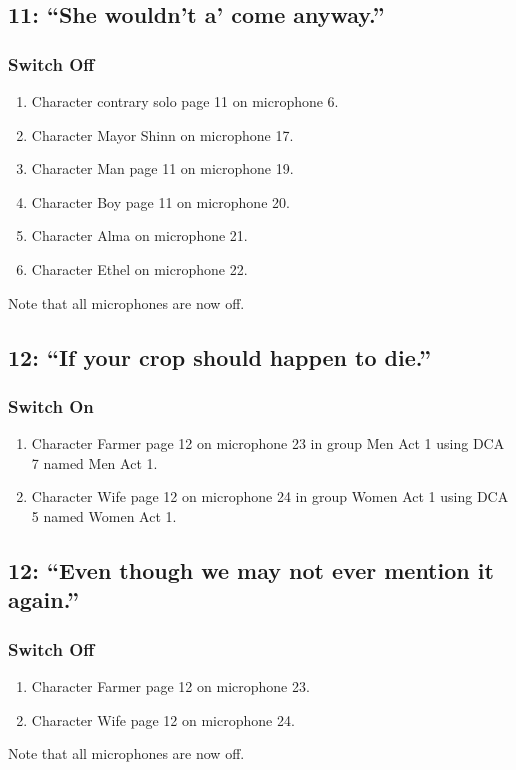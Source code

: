 \subsection* {11: ``She wouldn't a' come anyway.''}
\subsubsection* {Switch Off}
\begin{enumerate}
\item Character contrary solo page 11 on microphone 6.
\item Character Mayor Shinn on microphone 17.
\item Character Man page 11 on microphone 19.
\item Character Boy page 11 on microphone 20.
\item Character Alma on microphone 21.
\item Character Ethel on microphone 22.
\end{enumerate}
Note that all microphones are now off.
\subsection* {12: ``If your crop should happen to die.''}
\subsubsection* {Switch On}
\begin{enumerate}
\item Character Farmer page 12 on microphone 23 in group Men Act 1 using DCA 7 named Men Act 1.
\item Character Wife page 12 on microphone 24 in group Women Act 1 using DCA 5 named Women Act 1.
\end{enumerate}
\subsection* {12: ``Even though we may not ever mention it again.''}
\subsubsection* {Switch Off}
\begin{enumerate}
\item Character Farmer page 12 on microphone 23.
\item Character Wife page 12 on microphone 24.
\end{enumerate}
Note that all microphones are now off.
